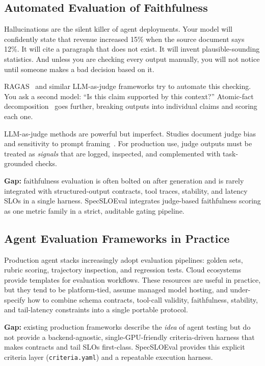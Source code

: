 \documentclass[11pt]{article}
\begin{document}
\subsection{Automated Evaluation of Faithfulness}

Hallucinations are the silent killer of agent deployments.
Your model will confidently state that revenue increased 15\% when the source document says 12\%.
It will cite a paragraph that does not exist.
It will invent plausible-sounding statistics.
And unless you are checking every output manually, you will not notice until someone makes a bad decision based on it.

RAGAS~\citep{es2023ragas} and similar LLM-as-judge frameworks try to automate this checking.
You ask a second model: ``Is this claim supported by this context?''
Atomic-fact decomposition~\citep{atomicFacts2023} goes further, breaking outputs into individual claims and scoring each one.

LLM-as-judge methods are powerful but imperfect.
Studies document judge bias and sensitivity to prompt framing~\citep{chen2024humans}.
For production use, judge outputs must be treated as \emph{signals} that are logged, inspected, and complemented with task-grounded checks.

\textbf{Gap:} faithfulness evaluation is often bolted on after generation and is rarely integrated with structured-output contracts, tool traces, stability, and latency SLOs in a single harness.
SpecSLOEval integrates judge-based faithfulness scoring as one metric family in a strict, auditable gating pipeline.

\subsection{Agent Evaluation Frameworks in Practice}

Production agent stacks increasingly adopt evaluation pipelines: golden sets, rubric scoring, trajectory inspection, and regression tests.
Cloud ecosystems provide templates for evaluation workflows.
These resources are useful in practice, but they tend to be platform-tied, assume managed model hosting, and under-specify how to combine schema contracts, tool-call validity, faithfulness, stability, and tail-latency constraints into a single portable protocol.

\textbf{Gap:} existing production frameworks describe the \emph{idea} of agent testing but do not provide a backend-agnostic, single-GPU-friendly criteria-driven harness that makes contracts and tail SLOs first-class.
SpecSLOEval provides this explicit criteria layer (\texttt{criteria.yaml}) and a repeatable execution harness.
\end{document}
